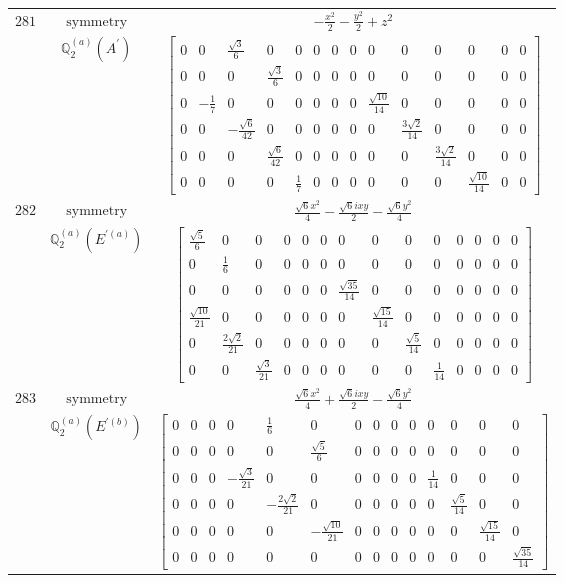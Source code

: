 \documentclass[fleqn,8pt,landscape]{jsarticle}
\begin{document}
\begin{longtable}{ccc}
$ 281 $ & $ \text{symmetry} $ & $ - \frac{x^{2}}{2} - \frac{y^{2}}{2} + z^{2} $ \\
$  $ & $ \mathbb{Q}_{2}^{(a)}(A^{\prime}) $ & $ \begin{bmatrix} 0 & 0 & \frac{\sqrt{3}}{6} & 0 & 0 & 0 & 0 & 0 & 0 & 0 & 0 & 0 & 0 & 0 \\ 0 & 0 & 0 & \frac{\sqrt{3}}{6} & 0 & 0 & 0 & 0 & 0 & 0 & 0 & 0 & 0 & 0 \\ 0 & - \frac{1}{7} & 0 & 0 & 0 & 0 & 0 & 0 & \frac{\sqrt{10}}{14} & 0 & 0 & 0 & 0 & 0 \\ 0 & 0 & - \frac{\sqrt{6}}{42} & 0 & 0 & 0 & 0 & 0 & 0 & \frac{3 \sqrt{2}}{14} & 0 & 0 & 0 & 0 \\ 0 & 0 & 0 & \frac{\sqrt{6}}{42} & 0 & 0 & 0 & 0 & 0 & 0 & \frac{3 \sqrt{2}}{14} & 0 & 0 & 0 \\ 0 & 0 & 0 & 0 & \frac{1}{7} & 0 & 0 & 0 & 0 & 0 & 0 & \frac{\sqrt{10}}{14} & 0 & 0 \end{bmatrix} $ \\ \hline
$ 282 $ & $ \text{symmetry} $ & $ \frac{\sqrt{6} x^{2}}{4} - \frac{\sqrt{6} i x y}{2} - \frac{\sqrt{6} y^{2}}{4} $ \\
$  $ & $ \mathbb{Q}_{2}^{(a)}(E^{\prime(a)}) $ & $ \begin{bmatrix} \frac{\sqrt{5}}{6} & 0 & 0 & 0 & 0 & 0 & 0 & 0 & 0 & 0 & 0 & 0 & 0 & 0 \\ 0 & \frac{1}{6} & 0 & 0 & 0 & 0 & 0 & 0 & 0 & 0 & 0 & 0 & 0 & 0 \\ 0 & 0 & 0 & 0 & 0 & 0 & \frac{\sqrt{35}}{14} & 0 & 0 & 0 & 0 & 0 & 0 & 0 \\ \frac{\sqrt{10}}{21} & 0 & 0 & 0 & 0 & 0 & 0 & \frac{\sqrt{15}}{14} & 0 & 0 & 0 & 0 & 0 & 0 \\ 0 & \frac{2 \sqrt{2}}{21} & 0 & 0 & 0 & 0 & 0 & 0 & \frac{\sqrt{5}}{14} & 0 & 0 & 0 & 0 & 0 \\ 0 & 0 & \frac{\sqrt{3}}{21} & 0 & 0 & 0 & 0 & 0 & 0 & \frac{1}{14} & 0 & 0 & 0 & 0 \end{bmatrix} $ \\ \hline
$ 283 $ & $ \text{symmetry} $ & $ \frac{\sqrt{6} x^{2}}{4} + \frac{\sqrt{6} i x y}{2} - \frac{\sqrt{6} y^{2}}{4} $ \\
$  $ & $ \mathbb{Q}_{2}^{(a)}(E^{\prime(b)}) $ & $ \begin{bmatrix} 0 & 0 & 0 & 0 & \frac{1}{6} & 0 & 0 & 0 & 0 & 0 & 0 & 0 & 0 & 0 \\ 0 & 0 & 0 & 0 & 0 & \frac{\sqrt{5}}{6} & 0 & 0 & 0 & 0 & 0 & 0 & 0 & 0 \\ 0 & 0 & 0 & - \frac{\sqrt{3}}{21} & 0 & 0 & 0 & 0 & 0 & 0 & \frac{1}{14} & 0 & 0 & 0 \\ 0 & 0 & 0 & 0 & - \frac{2 \sqrt{2}}{21} & 0 & 0 & 0 & 0 & 0 & 0 & \frac{\sqrt{5}}{14} & 0 & 0 \\ 0 & 0 & 0 & 0 & 0 & - \frac{\sqrt{10}}{21} & 0 & 0 & 0 & 0 & 0 & 0 & \frac{\sqrt{15}}{14} & 0 \\ 0 & 0 & 0 & 0 & 0 & 0 & 0 & 0 & 0 & 0 & 0 & 0 & 0 & \frac{\sqrt{35}}{14} \end{bmatrix} $ \\ \hline

\end{longtable}
\end{document}
